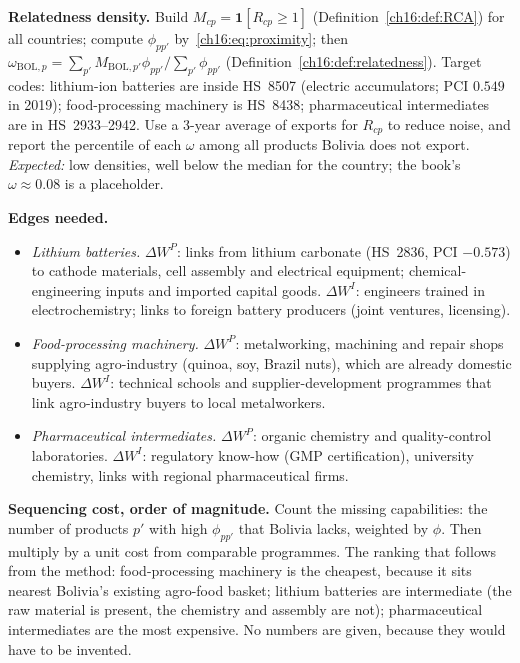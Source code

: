 \documentclass[../solutions_manual.tex]{subfiles}
\begin{document}
 \textbf{Relatedness density.} Build $M_{cp} = \mathbf{1}[R_{cp} \ge 1]$ (Definition~\ref{ch16:def:RCA}) for all countries; compute $\phi_{pp'}$ by~\eqref{ch16:eq:proximity}; then
$\omega_{\text{BOL},p} = \sum_{p'}M_{\text{BOL},p'}\phi_{pp'}/\sum_{p'}\phi_{pp'}$ (Definition~\ref{ch16:def:relatedness}). Target codes: lithium-ion batteries are inside HS~8507 (electric accumulators; PCI $0.549$ in 2019); food-processing machinery is HS~8438; pharmaceutical intermediates are in HS~2933--2942. Use a 3-year average of exports for $R_{cp}$ to reduce noise, and report the percentile of each $\omega$ among all products Bolivia does not export. \emph{Expected:} low densities, well below the median for the country; the book's $\omega \approx 0.08$ is a placeholder.

 \textbf{Edges needed.}
\begin{itemize}
\item \emph{Lithium batteries.} $\Delta W^P$: links from lithium carbonate (HS~2836, PCI $-0.573$) to cathode materials, cell assembly and electrical equipment; chemical-engineering inputs and imported capital goods. $\Delta W^I$: engineers trained in electrochemistry; links to foreign battery producers (joint ventures, licensing).
\item \emph{Food-processing machinery.} $\Delta W^P$: metalworking, machining and repair shops supplying agro-industry (quinoa, soy, Brazil nuts), which are already domestic buyers. $\Delta W^I$: technical schools and supplier-development programmes that link agro-industry buyers to local metalworkers.
\item \emph{Pharmaceutical intermediates.} $\Delta W^P$: organic chemistry and quality-control laboratories. $\Delta W^I$: regulatory know-how (GMP certification), university chemistry, links with regional pharmaceutical firms.
\end{itemize}

 \textbf{Sequencing cost, order of magnitude.} Count the missing capabilities: the number of products $p'$ with high $\phi_{pp'}$ that Bolivia lacks, weighted by $\phi$. Then multiply by a unit cost from comparable programmes. The ranking that follows from the method: food-processing machinery is the cheapest, because it sits nearest Bolivia's existing agro-food basket; lithium batteries are intermediate (the raw material is present, the chemistry and assembly are not); pharmaceutical intermediates are the most expensive. No numbers are given, because they would have to be invented.
\end{document}
